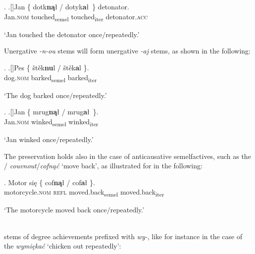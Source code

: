 \ex.\label{pres2} \label{dotykal}
\ag.[]\hspace{-22pt}Jan \{ dotk\textbf{n\k{a}}\l {} {/} {dotyk\textbf{a}\l \ \}} detonator.\\
\hspace{-22pt}Jan.\textsc{nom} {}  touched\textsubscript{semel} {}  touched\textsubscript{iter}  detonator.\textsc{acc}\\ 
\hspace{-22pt}\strut `Jan touched the detonator once$\slash$repeatedly.'

Unergative  \textit{-n-ou} stems will form unergative \textit{-aj} stems, as shown in the following:

\ex. 
\ag.[]\hspace{-22pt}Pes \{ \v{s}t\v{e}k\textbf{nu}l  {/} {\v{s}t\v{e}k\textbf{a}l \}}.\\
\hspace{-22pt}dog.\textsc{nom} {} barked\textsubscript{semel} {} {barked\textsubscript{iter}}\\
\hspace{-22pt}\strut `The dog barked once$\slash$repeatedly.'


\ex. 
\ag.[]\hspace{-22pt}Jan \{ mrug\textbf{n\k{a}}\l {} {/} {mrug\textbf{a}\l \ \}}.\\
\hspace{-22pt}Jan.\textsc{nom} {} winked\textsubscript{semel} {} {winked\textsubscript{iter}}\\
\hspace{-22pt}\strut `Jan winked once$\slash$repeatedly.'

The  preservation holds also in the case of anticausative semelfactives, such as the /  \textit{couvnout}/\textit{cofn\k{a}\'c} `move back', as illustrated for  in the following:

\exg.
Motor si\k{e} \{ cof\textbf{n\k{a}}\l {}  {/} {cof\textbf{a}\l {} \}}.\\
motorcycle.\textsc{nom} \textsc{refl} {} moved.back\textsubscript{semel} {}  {moved.back\textsubscript{iter}}\\ 
\strut `The motorcycle moved back once$\slash$repeatedly.'

\noindent
{}\\
stems of degree achievements prefixed with \textit{wy-}, like for instance in the case of the  \textit{wymi\k{e}ka\'c} `chicken out repeatedly':

